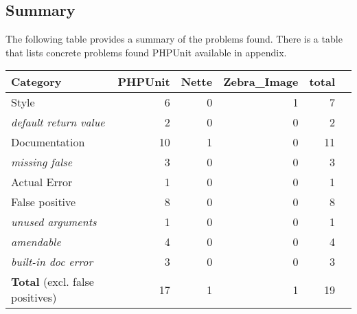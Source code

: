 \subsection{Summary}

The following table provides a summary of the problems found. 
There is a table that lists concrete problems found PHPUnit 
available in appendix.

\newcommand{\subcat}[1]{\hspace{0.5cm}\small{\textit{#1}}} 
\newcommand{\reldefret}{\subcat{default return value}}

\newcommand{\sumh}[1]{\textbf{#1}}

\begin{center}
    \begin{tabular}{| p{5cm} | r | r | r | r | r |}
    \hline
    \sumh{Category}         &   \sumh{PHPUnit}      &   \sumh{Nette}    & \sumh{Zebra\_Image}    &   \sumh{total}   \\ \hline
    Style                   &   6                   &   0               & 1                 &   7       \\ \hline
    \reldefret              &   2                   &   0               & 0                 &   2       \\ \hline        
    Documentation           &   10                  &   1               & 0                 &   11      \\ \hline    
    \subcat{missing false}  &   3                   &   0              & 0                  &   3       \\ \hline
    Actual Error            &   1                   &   0              & 0                  &   1      \\ \hline    
    False positive          &   8                   &   0              & 0                  &   8      \\ \hline    
   \subcat{unused arguments}&   1                   &   0              & 0                  &   1      \\ \hline        
    \subcat{amendable}      &   4                   &   0              & 0                  &   4      \\ \hline            
 \subcat{built-in doc error}&   3                   &   0              & 0                  &   3      \\ \hline
    \textbf{Total} 
    (excl. false positives) &17                   &   1              & 1            &   19      \\ \hline
    \end{tabular}
\end{center}



